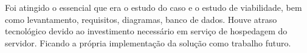 \documentclass[12pt]{article}
\begin{document}
Foi atingido o essencial que era o estudo do caso e o estudo de viabilidade, bem como levantamento, requisitos, diagramas, banco de dados.
Houve atraso tecnológico devido ao investimento necessário em serviço de hospedagem do servidor. Ficando a própria implementação da solução como trabalho futuro.





\end{document}
